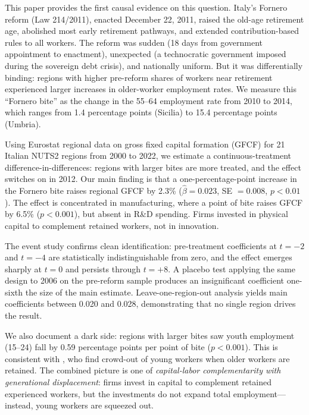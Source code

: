 \documentclass[12pt]{article}
\begin{document}
This paper provides the first causal evidence on this question. Italy's Fornero reform (Law 214/2011), enacted December 22, 2011, raised the old-age retirement age, abolished most early retirement pathways, and extended contribution-based rules to all workers. The reform was sudden (18 days from government appointment to enactment), unexpected (a technocratic government imposed during the sovereign debt crisis), and nationally uniform. But it was differentially binding: regions with higher pre-reform shares of workers near retirement experienced larger increases in older-worker employment rates. We measure this ``Fornero bite'' as the change in the 55--64 employment rate from 2010 to 2014, which ranges from 1.4 percentage points (Sicilia) to 15.4 percentage points (Umbria).

Using Eurostat regional data on gross fixed capital formation (GFCF) for 21 Italian NUTS2 regions from 2000 to 2022, we estimate a continuous-treatment difference-in-differences: regions with larger bites are more treated, and the effect switches on in 2012. Our main finding is that a one-percentage-point increase in the Fornero bite raises regional GFCF by 2.3\% ($\hat{\beta} = 0.023$, SE $= 0.008$, $p < 0.01$). The effect is concentrated in manufacturing, where a point of bite raises GFCF by 6.5\% ($p < 0.001$), but absent in R\&D spending. Firms invested in physical capital to complement retained workers, not in innovation.

The event study confirms clean identification: pre-treatment coefficients at $t = -2$ and $t = -4$ are statistically indistinguishable from zero, and the effect emerges sharply at $t = 0$ and persists through $t = +8$. A placebo test applying the same design to 2006 on the pre-reform sample produces an insignificant coefficient one-sixth the size of the main estimate. Leave-one-region-out analysis yields main coefficients between 0.020 and 0.028, demonstrating that no single region drives the result.

We also document a dark side: regions with larger bites saw youth employment (15--24) fall by 0.59 percentage points per point of bite ($p < 0.001$). This is consistent with \citet{boeri2017}, who find crowd-out of young workers when older workers are retained. The combined picture is one of \textit{capital-labor complementarity with generational displacement}: firms invest in capital to complement retained experienced workers, but the investments do not expand total employment---instead, young workers are squeezed out.
\end{document}
